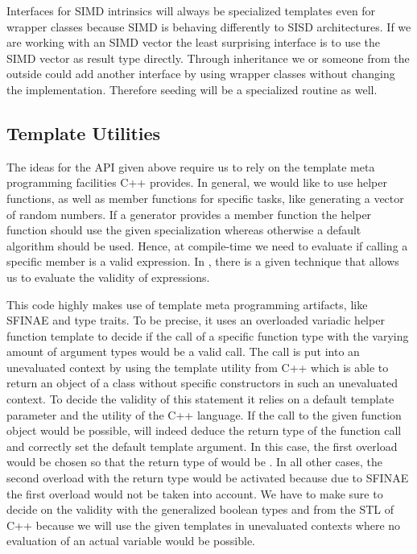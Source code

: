\documentclass{stdlocal}
\begin{document}
    Interfaces for SIMD intrinsics will always be specialized templates even for wrapper classes because SIMD is behaving differently to SISD architectures.
    If we are working with an SIMD vector the least surprising interface is to use the SIMD vector as result type directly.
    Through inheritance we or someone from the outside could add another interface by using wrapper classes without changing the implementation.
    Therefore seeding will be a specialized routine as well.

  \subsection{Template Utilities} %
  \label{sub:utilities}
    The ideas for the API given above require us to rely on the template meta programming facilities C++ provides.
    In general, we would like to use helper functions, as well as member functions for specific tasks, like generating a vector of random numbers.
    If a generator provides a member function the helper function should use the given specialization whereas otherwise a default algorithm should be used.
    Hence, at compile-time we need to evaluate if calling a specific member is a valid expression.
    In \textcite{vandevoorde2018}, there is a given technique that allows us to evaluate the validity of expressions.

    This code highly makes use of template meta programming artifacts, like SFINAE and type traits.
    To be precise, it uses an overloaded variadic helper function template  to decide if the call of a specific function type  with the varying amount of argument types  would be a valid call.
    The call is put into an unevaluated context by using the  template utility from C++ which is able to return an object of a class without specific constructors in such an unevaluated context.
    To decide the validity of this statement it relies on a default template parameter and the  utility of the C++ language.
    If the call to the given function object would be possible,  will indeed deduce the return type of the function call and correctly set the default template argument.
    In this case, the first overload would be chosen so that the return type of  would be .
    In all other cases, the second overload with the return type  would be activated because due to SFINAE the first overload would not be taken into account.
    We have to make sure to decide on the validity with the generalized boolean types  and  from the STL of C++ because we will use the given templates in unevaluated contexts where no evaluation of an actual  variable would be possible.
\end{document}
